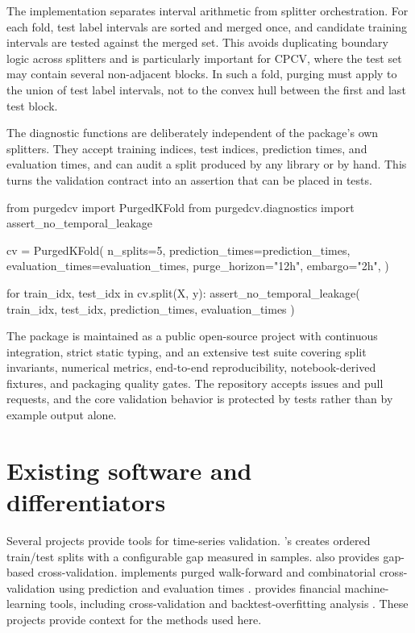 \documentclass[article]{jdssv}
\begin{document}
The implementation separates interval arithmetic from splitter orchestration.
For each fold, test label intervals are sorted and merged once, and candidate
training intervals are tested against the merged set. This avoids duplicating
boundary logic across splitters and is particularly important for CPCV, where
the test set may contain several non-adjacent blocks. In such a fold, purging
must apply to the union of test label intervals, not to the convex hull between
the first and last test block.

The diagnostic functions are deliberately independent of the package's own
splitters. They accept training indices, test indices, prediction times, and
evaluation times, and can audit a split produced by any library or by hand. This
turns the validation contract into an assertion that can be placed in tests.

\begin{Code}
from purgedcv import PurgedKFold
from purgedcv.diagnostics import assert_no_temporal_leakage

cv = PurgedKFold(
    n_splits=5,
    prediction_times=prediction_times,
    evaluation_times=evaluation_times,
    purge_horizon="12h",
    embargo="2h",
)

for train_idx, test_idx in cv.split(X, y):
    assert_no_temporal_leakage(
        train_idx, test_idx, prediction_times, evaluation_times
    )
\end{Code}

The package is maintained as a public open-source project with continuous
integration, strict static typing, and an extensive test suite covering split
invariants, numerical metrics, end-to-end reproducibility, notebook-derived
fixtures, and packaging quality gates. The repository accepts issues and pull
requests, and the core validation behavior is protected by tests rather than by
example output alone.

\section{Existing software and differentiators}

Several projects provide tools for time-series validation.
's  creates ordered train/test splits
with a configurable gap measured in samples.  also provides
gap-based cross-validation.  implements purged walk-forward
and combinatorial cross-validation using prediction and evaluation times
\citep{timeseriescv2018}.  provides financial machine-learning
tools, including cross-validation and backtest-overfitting analysis
\citep{mlfinlab2026}. These projects provide context for the methods used here.
\end{document}
